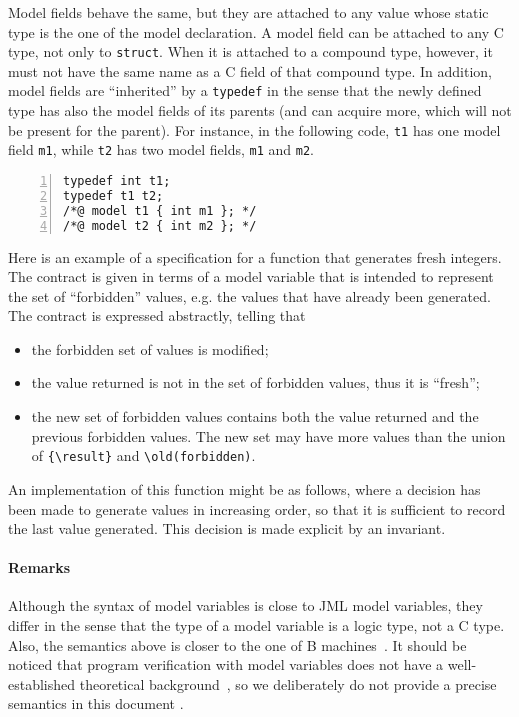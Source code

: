 Model fields behave the same, but they are attached to any value whose static
type is the one of the model declaration. A model field can be attached to any
C type, not only to \texttt{struct}. When it is attached to a compound type,
however, it must not have the same name as a C field of that compound type.
In addition, model fields are ``inherited'' by a \texttt{typedef}
in the sense that the newly defined type has also the model fields of its
parents (and can acquire more, which will not be present for the parent).
For instance, in the following code, \texttt{t1} has one model field
\texttt{m1}, while \texttt{t2} has two model fields,
\texttt{m1} and \texttt{m2}.
\begin{lstlisting}[style=c,basicstyle=\lp@basic,numbers=left]
typedef int t1;
typedef t1 t2;
/*@ model t1 { int m1 }; */
/*@ model t2 { int m2 }; */
\end{lstlisting}

\begin{example}\label{ex:model}
  Here is an example of a specification for a function that generates
  fresh integers. The contract is given in terms of a model variable
  that is intended to represent the set of ``forbidden'' values,
  e.g. the values that have already been generated.
  The contract is expressed abstractly, telling that
  \begin{itemize}
  \item the forbidden set of values is modified;
  \item the value returned is not in the set of forbidden values, thus
    it is ``fresh'';
  \item the new set of forbidden values contains both the value
    returned and the previous forbidden values.
    The new set may have more values than the union of \lstinline|{\result}|
    and \lstinline|\old(forbidden)|.
  \end{itemize}
  An implementation of this function might be as follows, where a
  decision has been made to generate values in increasing order, so
  that it is sufficient to record the last value generated. This decision
  is made explicit by an invariant.
\end{example}

\paragraph{Remarks}

Although the syntax of model variables is close to JML model
variables, they differ in the sense that the type of a model variable
is a logic type, not a C type. Also, the semantics above is closer to
the one of B machines~\cite{abrial96:_b_book}. It should be noticed
that program verification with model variables does not have a
well-established theoretical background~\cite{marche07,leavens07}, so
we deliberately do not provide a precise semantics in this document .


